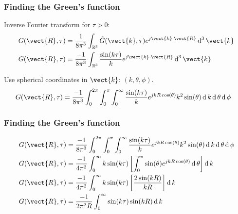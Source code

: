 \documentclass[12 pt, compress, handout, intlimits]{beamer}
\renewcommand{\d}{\operatorname{d}}
\newcommand{\ft}[1]{\tilde{#1}}
\begin{document}
\note{}

\begin{frame}[fragile]
    \frametitle{Finding the Green's function}

    Inverse Fourier transform for $ \tau > 0 $:
    \begin{align*}
        G(\vect{R},\tau) &= \frac{1}{8 \pi^3} \int_{\mathbb{R}^3} \ft{G}(\vect{k},\tau) e^{j \vect{k} \cdot \vect{R}} \d^3 \vect{k}
        \\
        G(\vect{R},\tau) &= \frac{-1}{8 \pi^3} \int_{\mathbb{R}^3} \frac{\sin(k \tau)}{k} e^{j \vect{k} \cdot \vect{R}} \d^3 \vect{k}
    \end{align*}

    Use spherical coordinates in $ \vect{k} $: $ (k, \theta, \phi) $.
    \begin{align*}
        G(\vect{R},\tau) &= \frac{-1}{8 \pi^3} \int_0^{2 \pi} \int_0^\pi \int_0^\infty \frac{\sin(k \tau)}{k} e^{j k R \cos(\theta)} k^2 \sin(\theta) \d k \d \theta \d \phi
    \end{align*}
    
\end{frame}

\note{}

\begin{frame}[fragile]
    \frametitle{Finding the Green's function}
    
    \begin{align*}
        G(\vect{R},\tau) &= \frac{-1}{8 \pi^3} \int_0^{2 \pi} \int_0^\pi \int_0^\infty \frac{\sin(k \tau)}{k} e^{j k R \cos(\theta)} k^2 \sin(\theta) \d k \d \theta \d \phi
        \\
        G(\vect{R},\tau) &= \frac{-1}{4 \pi^2} \int_0^\infty k \sin(k \tau) \left[ \int_0^\pi \sin(\theta) e^{j k R \cos(\theta)} \d \theta \right] \d k
        \\
        G(\vect{R},\tau) &= \frac{-1}{4 \pi^2} \int_0^\infty k \sin(k \tau) \left[ \frac{2 \sin(k R)}{k R} \right] \d k
        \\
        G(\vect{R},\tau) &= \frac{-1}{2 \pi^2 R} \int_0^\infty \sin(k \tau) \sin(k R) \d k
    \end{align*}
    
\end{frame}

\note{}
\end{document}
